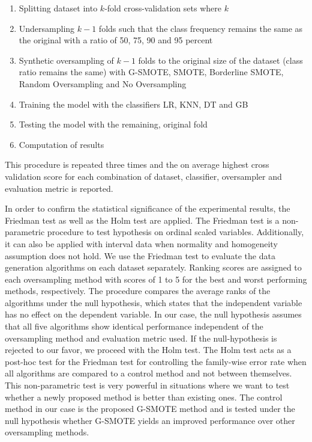 \documentclass[parskip=full]{scrartcl}
\begin{document}
\begin{enumerate}
	\item 
	Splitting dataset into \( k \)-fold cross-validation sets where \( k \)
	\item 
	Undersampling \( k - 1 \) folds such that the class frequency remains 
	the same as the original with a ratio of 50, 75, 90 and 95 percent
	\item 
	Synthetic oversampling of \( k - 1 \) folds to the original size of 
	the dataset (class ratio remains the same) with G-SMOTE, SMOTE, Borderline 
	SMOTE, Random Oversampling and No Oversampling
	\item 
	Training the model with the classifiers LR, KNN, DT and GB
	\item 
	Testing the model with the remaining, original fold
	\item 
	Computation of results
\end{enumerate}	

This procedure is repeated three times and the on average highest cross 
validation score for each combination of dataset, classifier, oversampler and 
evaluation metric is reported.

In order to confirm the statistical significance of the experimental results, 
the Friedman test \cite{Sheldon.1996} as well as the Holm test 
\cite{JanezDemsar.2006} are applied. The Friedman test is a non-parametric 
procedure to test hypothesis on ordinal scaled variables. Additionally, it can 
also be applied with interval data when normality and homogeneity assumption 
does not hold. We use the Friedman test to evaluate the data generation 
algorithms on each dataset separately. Ranking scores are assigned to each 
oversampling method with scores of 1 to 5 for the best and worst performing 
methods, respectively. The procedure compares the average ranks of the 
algorithms under the null hypothesis, which states that the independent 
variable has no effect on the dependent variable. In our case, the null 
hypothesis assumes that all five algorithms show identical performance 
independent of the oversampling method and evaluation metric used. If the 
null-hypothesis is rejected to our favor, we proceed with the Holm test. The 
Holm test acts as a post-hoc test for the Friedman test for controlling the 
family-wise error rate when all algorithms are compared to a control method and 
not between themselves. This non-parametric test is very powerful in situations 
where we want to test whether a newly proposed method is better than existing 
ones. The control method in our case is the proposed G-SMOTE method and is 
tested under the null hypothesis whether G-SMOTE yields an improved performance 
over other oversampling methods.
\end{document}
